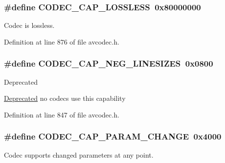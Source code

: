 \subsubsection[{\texorpdfstring{C\+O\+D\+E\+C\+\_\+\+C\+A\+P\+\_\+\+L\+O\+S\+S\+L\+E\+SS}{CODEC_CAP_LOSSLESS}}]{\setlength{\rightskip}{0pt plus 5cm}\#define C\+O\+D\+E\+C\+\_\+\+C\+A\+P\+\_\+\+L\+O\+S\+S\+L\+E\+SS~0x80000000}\hypertarget{group__lavc__core_ga0d509737b1d687314ab97c7cebfd7ace}{}\label{group__lavc__core_ga0d509737b1d687314ab97c7cebfd7ace}
Codec is lossless. 

Definition at line 876 of file avcodec.\+h.

\subsubsection[{\texorpdfstring{C\+O\+D\+E\+C\+\_\+\+C\+A\+P\+\_\+\+N\+E\+G\+\_\+\+L\+I\+N\+E\+S\+I\+Z\+ES}{CODEC_CAP_NEG_LINESIZES}}]{\setlength{\rightskip}{0pt plus 5cm}\#define C\+O\+D\+E\+C\+\_\+\+C\+A\+P\+\_\+\+N\+E\+G\+\_\+\+L\+I\+N\+E\+S\+I\+Z\+ES~0x0800}\hypertarget{group__lavc__core_ga19dfa49f18ea643e695ee530d060f7de}{}\label{group__lavc__core_ga19dfa49f18ea643e695ee530d060f7de}
\begin{DoxyRefDesc}{Deprecated}
\item[\hyperlink{deprecated__deprecated000003}{Deprecated}]no codecs use this capability \end{DoxyRefDesc}


Definition at line 847 of file avcodec.\+h.

\subsubsection[{\texorpdfstring{C\+O\+D\+E\+C\+\_\+\+C\+A\+P\+\_\+\+P\+A\+R\+A\+M\+\_\+\+C\+H\+A\+N\+GE}{CODEC_CAP_PARAM_CHANGE}}]{\setlength{\rightskip}{0pt plus 5cm}\#define C\+O\+D\+E\+C\+\_\+\+C\+A\+P\+\_\+\+P\+A\+R\+A\+M\+\_\+\+C\+H\+A\+N\+GE~0x4000}\hypertarget{group__lavc__core_gacfc914c55131ea82907741fec6ccac98}{}\label{group__lavc__core_gacfc914c55131ea82907741fec6ccac98}
Codec supports changed parameters at any point. 

